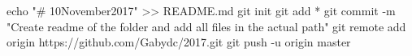 echo "# 10November2017" >> README.md
git init
git add *
git commit -m "Create readme of the folder and add all files in the actual path"
git remote add origin https://github.com/Gabydc/2017.git
git push -u origin master
